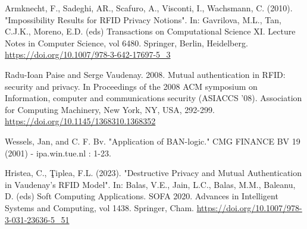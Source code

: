 \begin{thebibliography}{9}
Armknecht, F., Sadeghi, AR., Scafuro, A., Visconti, I., Wachsmann, C. (2010). 
"Impossibility Results for RFID Privacy Notions". In: Gavrilova, M.L., Tan, C.J.K., Moreno, E.D. (eds) Transactions on Computational Science XI. 
Lecture Notes in Computer Science, vol 6480. Springer, Berlin, Heidelberg. \url{https://doi.org/10.1007/978-3-642-17697-5_3}

Radu-Ioan Paise and Serge Vaudenay. 2008. Mutual authentication in RFID: security and privacy. In Proceedings of the 2008 ACM symposium on 
Information, computer and communications security (ASIACCS '08). Association for Computing Machinery, New York, NY, USA, 292-299. 
\url{https://doi.org/10.1145/1368310.1368352}

Wessels, Jan, and C. F. Bv. "Application of BAN-logic." CMG FINANCE BV 19 (2001) - ipa.win.tue.nl : 1-23. 

Hristea, C., Ţiplea, F.L. (2023). "Destructive Privacy and Mutual Authentication in Vaudenay's RFID Model". 
In: Balas, V.E., Jain, L.C., Balas, M.M., Baleanu, D. (eds) Soft Computing Applications. SOFA 2020. 
Advances in Intelligent Systems and Computing, vol 1438. Springer, Cham. \url{https://doi.org/10.1007/978-3-031-23636-5_51}

\end{thebibliography}